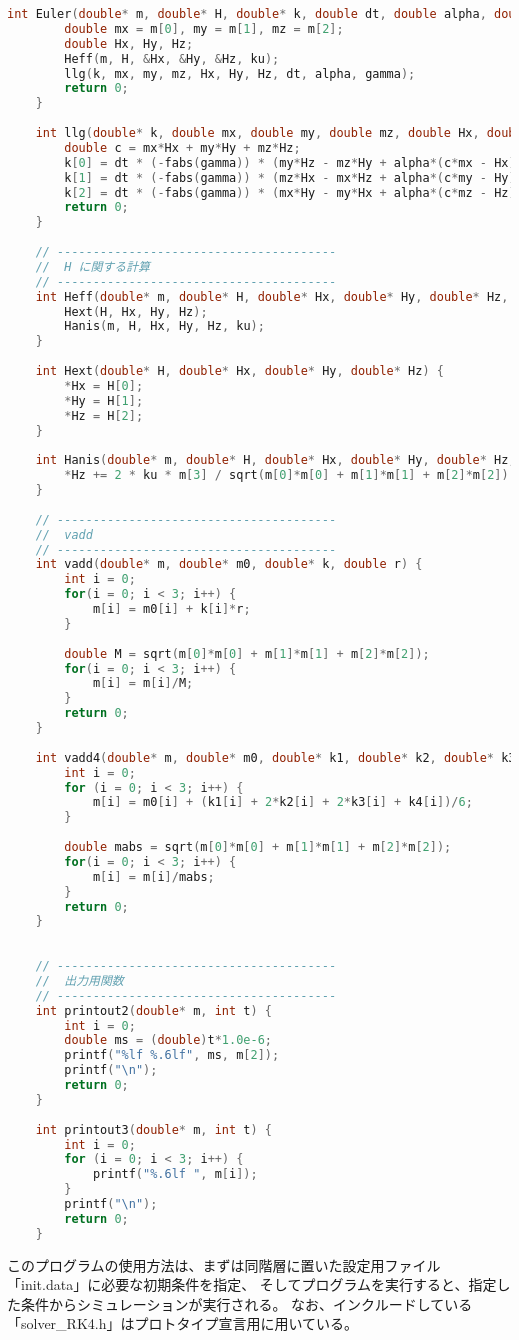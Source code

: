 \documentclass{jsarticle}
\begin{document}
\begin{lstlisting}[H, caption=4次のルンゲクッタ法で解を得るプログラム, label=list01, language=C++]
	int Euler(double* m, double* H, double* k, double dt, double alpha, double gamma, double ku) {
		double mx = m[0], my = m[1], mz = m[2];
		double Hx, Hy, Hz;
		Heff(m, H, &Hx, &Hy, &Hz, ku);
		llg(k, mx, my, mz, Hx, Hy, Hz, dt, alpha, gamma);
		return 0;
	}
	
	int llg(double* k, double mx, double my, double mz, double Hx, double Hy, double Hz, double dt, double alpha, double gamma) {
		double c = mx*Hx + my*Hy + mz*Hz;
		k[0] = dt * (-fabs(gamma)) * (my*Hz - mz*Hy + alpha*(c*mx - Hx)) / (1 + alpha*alpha);
		k[1] = dt * (-fabs(gamma)) * (mz*Hx - mx*Hz + alpha*(c*my - Hy)) / (1 + alpha*alpha);
		k[2] = dt * (-fabs(gamma)) * (mx*Hy - my*Hx + alpha*(c*mz - Hz)) / (1 + alpha*alpha);
		return 0;
	}
	
	// ---------------------------------------
	//	H に関する計算
	// ---------------------------------------
	int Heff(double* m, double* H, double* Hx, double* Hy, double* Hz, double ku) {
		Hext(H, Hx, Hy, Hz);
		Hanis(m, H, Hx, Hy, Hz, ku);
	}
	
	int Hext(double* H, double* Hx, double* Hy, double* Hz) {
		*Hx = H[0];
		*Hy = H[1];
		*Hz = H[2];
	}
	
	int Hanis(double* m, double* H, double* Hx, double* Hy, double* Hz, double ku) {
		*Hz += 2 * ku * m[3] / sqrt(m[0]*m[0] + m[1]*m[1] + m[2]*m[2]);
	}
	
	// ---------------------------------------
	//	vadd 
	// ---------------------------------------
	int vadd(double* m, double* m0, double* k, double r) {
		int i = 0;
		for(i = 0; i < 3; i++) {
			m[i] = m0[i] + k[i]*r;
		}
	
		double M = sqrt(m[0]*m[0] + m[1]*m[1] + m[2]*m[2]);
		for(i = 0; i < 3; i++) {
			m[i] = m[i]/M;
		}
		return 0;
	}
	
	int vadd4(double* m, double* m0, double* k1, double* k2, double* k3, double* k4) {
		int i = 0;
		for (i = 0; i < 3; i++) {
			m[i] = m0[i] + (k1[i] + 2*k2[i] + 2*k3[i] + k4[i])/6;
		}
	
		double mabs = sqrt(m[0]*m[0] + m[1]*m[1] + m[2]*m[2]);
		for(i = 0; i < 3; i++) {
			m[i] = m[i]/mabs;
		}
		return 0;
	}
	
	
	// ---------------------------------------
	//	出力用関数
	// ---------------------------------------
	int printout2(double* m, int t) {
		int i = 0;
		double ms = (double)t*1.0e-6;
		printf("%lf %.6lf", ms, m[2]);
		printf("\n");
		return 0;
	}
	
	int printout3(double* m, int t) {
		int i = 0;
		for (i = 0; i < 3; i++) {
			printf("%.6lf ", m[i]);
		}
		printf("\n");
		return 0;
	}
\end{lstlisting}
このプログラムの使用方法は、まずは同階層に置いた設定用ファイル「init.data」に必要な初期条件を指定、
そしてプログラムを実行すると、指定した条件からシミュレーションが実行される。
なお、インクルードしている「solver\_RK4.h」はプロトタイプ宣言用に用いている。
\end{document}

